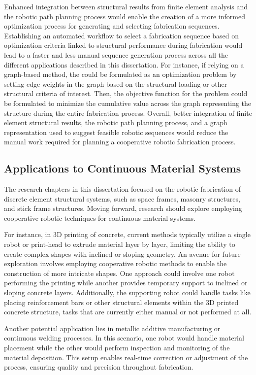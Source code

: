         Enhanced integration between structural results from finite element analysis and the robotic path planning process would enable the creation of a more informed optimization process for generating and selecting fabrication sequences. Establishing an automated workflow to select a fabrication sequence based on optimization criteria linked to structural performance during fabrication would lead to a faster and less manual sequence generation process across all the different applications described in this dissertation. For instance, if relying on a graph-based method, the could be formulated as an optimization problem by setting edge weights in the graph based on the structural loading or other structural criteria of interest. Then, the objective function for the problem could be formulated to minimize the cumulative value across the graph representing the structure during the entire fabrication process. Overall, better integration of finite element structural results, the robotic path planning process, and a graph representation used to suggest feasible robotic sequences would reduce the manual work required for planning a cooperative robotic fabrication process.

    \subsection{Applications to Continuous Material Systems}
        The research chapters in this dissertation focused on the robotic fabrication of discrete element structural systems, such as space frames, masonry structures, and stick frame structures. Moving forward, research should explore employing cooperative robotic techniques for continuous material systems.

        For instance, in 3D printing of concrete, current methods typically utilize a single robot or print-head to extrude material layer by layer, limiting the ability to create complex shapes with inclined or sloping geometry. An avenue for future exploration involves employing cooperative robotic methods to enable the construction of more intricate shapes. One approach could involve one robot performing the printing while another provides temporary support to inclined or sloping concrete layers. Additionally, the supporting robot could handle tasks like placing reinforcement bars or other structural elements within the 3D printed concrete structure, tasks that are currently either manual or not performed at all.

        Another potential application lies in metallic additive manufacturing or continuous welding processes. In this scenario, one robot would handle material placement while the other would perform inspection and monitoring of the material deposition. This setup enables real-time correction or adjustment of the process, ensuring quality and precision throughout fabrication.

